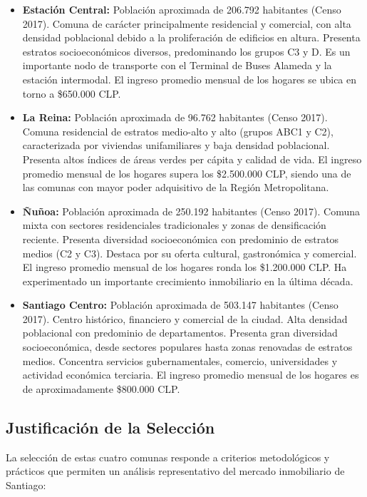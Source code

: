 \begin{itemize}
    \item \textbf{Estación Central:} Población aproximada de 206.792 habitantes (Censo 2017). Comuna de carácter principalmente residencial y comercial, con alta densidad poblacional debido a la proliferación de edificios en altura. Presenta estratos socioeconómicos diversos, predominando los grupos C3 y D. Es un importante nodo de transporte con el Terminal de Buses Alameda y la estación intermodal. El ingreso promedio mensual de los hogares se ubica en torno a \$650.000 CLP.
    
    \item \textbf{La Reina:} Población aproximada de 96.762 habitantes (Censo 2017). Comuna residencial de estratos medio-alto y alto (grupos ABC1 y C2), caracterizada por viviendas unifamiliares y baja densidad poblacional. Presenta altos índices de áreas verdes per cápita y calidad de vida. El ingreso promedio mensual de los hogares supera los \$2.500.000 CLP, siendo una de las comunas con mayor poder adquisitivo de la Región Metropolitana.
    
    \item \textbf{Ñuñoa:} Población aproximada de 250.192 habitantes (Censo 2017). Comuna mixta con sectores residenciales tradicionales y zonas de densificación reciente. Presenta diversidad socioeconómica con predominio de estratos medios (C2 y C3). Destaca por su oferta cultural, gastronómica y comercial. El ingreso promedio mensual de los hogares ronda los \$1.200.000 CLP. Ha experimentado un importante crecimiento inmobiliario en la última década.
    
    \item \textbf{Santiago Centro:} Población aproximada de 503.147 habitantes (Censo 2017). Centro histórico, financiero y comercial de la ciudad. Alta densidad poblacional con predominio de departamentos. Presenta gran diversidad socioeconómica, desde sectores populares hasta zonas renovadas de estratos medios. Concentra servicios gubernamentales, comercio, universidades y actividad económica terciaria. El ingreso promedio mensual de los hogares es de aproximadamente \$800.000 CLP.
\end{itemize}

\subsection{Justificación de la Selección}

La selección de estas cuatro comunas responde a criterios metodológicos y prácticos que permiten un análisis representativo del mercado inmobiliario de Santiago:


